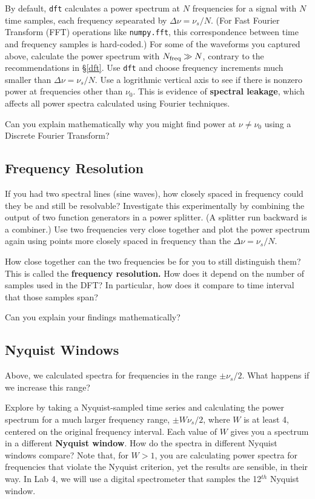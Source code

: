 \documentclass[12pt,preprint]{aastex}
\begin{document}
\noindent
By default, \verb$dft$ calculates a power spectrum at $N$ frequencies for a signal with 
$N$ time samples, each frequency sepearated by $\Delta\nu = \nu_s/N$. (For Fast Fourier Transform (FFT)
operations like \verb$numpy.fft$, this correspondence between time and frequency samples is hard-coded.) 
For some of the waveforms you captured above, calculate
the power spectrum with $N_{\rm freq}\gg N$, contrary to the
recommendations in \S \ref{dft}. Use \verb$dft$ and choose 
frequency increments much smaller than $\Delta \nu = \nu_s/N$.
Use a logrithmic vertical axis to see if there is nonzero power at
frequencies other than $\nu_0$.  This
is evidence of {\bf spectral leakage}, which affects all power spectra 
calculated using Fourier techniques. 

Can you explain mathematically why you might find power at $\nu\ne\nu_0$ using a Discrete Fourier Transform?

\subsection{Frequency Resolution} \label{freqres}

\noindent
If you had two spectral lines (sine waves), how closely spaced in frequency
could they be and still be resolvable? Investigate this experimentally by
combining the output of two function generators in a power splitter. (A splitter
run backward is a combiner.) Use two 
frequencies very close together and plot the power spectrum again
using points more closely spaced in frequency
than the $\Delta \nu = \nu_s/N$.

How close together can the two frequencies be for you to still 
distinguish them? This is called the {\bf frequency resolution.} How
does it depend on the number of samples used in the DFT? In
particular, how does it compare to time interval that
those samples span?

Can you explain your findings mathematically?

\subsection{Nyquist Windows}

\noindent
Above, we calculated spectra for frequencies in the range $\pm
\nu_s/2$. What happens if we increase this range?

Explore by
taking a Nyquist-sampled time series and calculating the power
spectrum for a much larger frequency range, $\pm W \nu_s/2$, where
$W$ is at least 4, centered on the original frequency interval. Each value
of $W$ gives you a spectrum in a different {\bf Nyquist window}. How do
the spectra in different Nyquist windows compare? Note that, for $W>1$,
you are calculating power spectra for frequencies that violate the
Nyquist criterion, yet the results are sensible, in their way. 
In Lab 4, we will use a digital spectrometer that samples the
12$^{th}$ Nyquist window.
\end{document}
